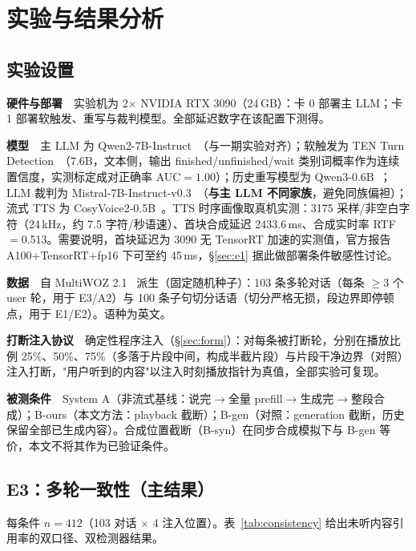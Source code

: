 \documentclass[conference]{IEEEtran}
\theoremstyle{definition}
\begin{document}
\section{实验与结果分析}\label{sec:eval}

\subsection{实验设置}
\textbf{硬件与部署}　实验机为 2$\times$ NVIDIA RTX 3090（24\,GB）：卡 0 部署主 LLM；卡 1 部署软触发、重写与裁判模型。全部延迟数字在该配置下测得。

\textbf{模型}　主 LLM 为 Qwen2-7B-Instruct~\cite{qwen2}（与一期实验对齐）；软触发为 TEN Turn Detection~\cite{ten_turn}（7.6B，文本侧，输出 finished/unfinished/wait 类别词概率作为连续置信度，实测标定成对正确率 AUC$=1.00$）；历史重写模型为 Qwen3-0.6B~\cite{qwen3}；LLM 裁判为 Mistral-7B-Instruct-v0.3~\cite{mistral7b}（\textbf{与主 LLM 不同家族}，避免同族偏袒）；流式 TTS 为 CosyVoice2-0.5B~\cite{cosyvoice2}。TTS 时序画像取真机实测：3175 采样/非空白字符（24\,kHz，约 7.5 字符/秒语速）、首块合成延迟 2433.6\,ms、合成实时率 RTF$=$0.513。需要说明，首块延迟为 3090 无 TensorRT 加速的实测值，官方报告 A100+TensorRT+fp16 下可至约 45\,ms，\S\ref{sec:e1} 据此做部署条件敏感性讨论。

\textbf{数据}　自 MultiWOZ 2.1~\cite{multiwoz21} 派生（固定随机种子）：103 条多轮对话（每条 $\ge$3 个 user 轮，用于 E3/A2）与 100 条子句切分话语（切分严格无损，段边界即停顿点，用于 E1/E2）。语种为英文。

\textbf{打断注入协议}　确定性程序注入（\S\ref{sec:form}）：对每条被打断轮，分别在播放比例 25\%、50\%、75\%（多落于片段中间，构成半截片段）与片段干净边界（对照）注入打断，"用户听到的内容"以注入时刻播放指针为真值，全部实验可复现。

\textbf{被测条件}　System A（非流式基线：说完$\rightarrow$全量 prefill$\rightarrow$生成完$\rightarrow$整段合成）；B-ours（本文方法：playback 截断）；B-gen（对照：generation 截断，历史保留全部已生成内容）。合成位置截断（B-syn）在同步合成模拟下与 B-gen 等价，本文不将其作为已验证条件。

\subsection{E3：多轮一致性（主结果）}\label{sec:e3}
每条件 $n{=}412$（103 对话 $\times$ 4 注入位置）。表~\ref{tab:consistency} 给出未听内容引用率的双口径、双检测器结果。
\end{document}
